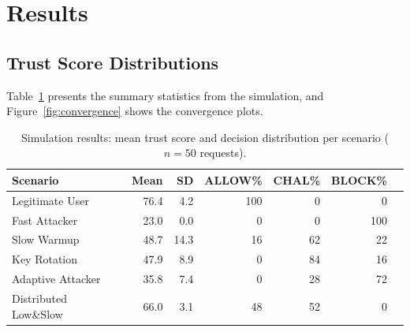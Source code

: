 \documentclass[10pt,conference]{IEEEtran}
\begin{document}
\section{Results}
\label{sec:results}

\subsection{Trust Score Distributions}

Table~\ref{tab:scores} presents the summary statistics from the
simulation, and Figure~\ref{fig:convergence} shows the convergence
plots.

\begin{table}[h]
  \centering
  \caption{Simulation results: mean trust score and decision
           distribution per scenario ($n = 50$ requests).}
  \label{tab:scores}
  \footnotesize
  \begin{tabular}{@{}lrrrrrr@{}}
    \toprule
    \textbf{Scenario} & \textbf{Mean} & \textbf{SD}
      & \textbf{ALLOW\%} & \textbf{CHAL\%} & \textbf{BLOCK\%} \\
    \midrule
    Legitimate User          & 76.4 & 4.2  & 100 & 0   & 0  \\
    Fast Attacker            & 23.0 & 0.0  & 0   & 0   & 100 \\
    Slow Warmup              & 48.7 & 14.3 & 16  & 62  & 22 \\
    Key Rotation             & 47.9 & 8.9  & 0   & 84  & 16 \\
    Adaptive Attacker        & 35.8 & 7.4  & 0   & 28  & 72 \\
    Distributed Low\&Slow    & 66.0 & 3.1  & 48  & 52  & 0  \\
    \bottomrule
  \end{tabular}
\end{table}
\end{document}
